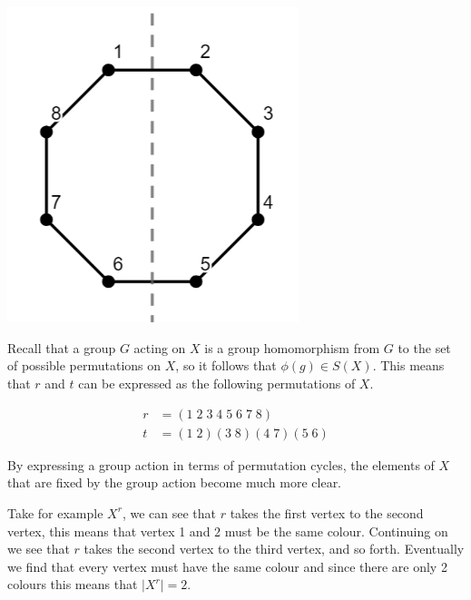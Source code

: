 \documentclass[../main.tex]{subfiles}
\begin{document}
    \begin{center}
    \includegraphics[width=85mm]{images/D8_sym.png}   
    \end{center}

    Recall that a group $G$ acting on $X$ is a group homomorphism from $G$ to the set of possible permutations on $X$, so it follows that $\phi(g) \in S(X)$. This means that $r$ and $t$ can be expressed as the following permutations of $X$.
    
    \begin{align*}
        r &= (1 \;2 \;3 \;4 \;5 \;6 \;7 \;8) \\
        t &= (1 \;2)(3 \;8)(4 \;7)(5 \;6)
    \end{align*}

    By expressing a group action in terms of permutation cycles, the elements of $X$ that are fixed by the group action become much more clear.

    Take for example $X^r$, we can see that $r$ takes the first vertex to the second vertex, this means that vertex 1 and 2 must be the same colour. Continuing on we see that $r$ takes the second vertex to the third vertex, and so forth. Eventually we find that every vertex must have the same colour and since there are only 2 colours this means that $\lvert X^r \rvert = 2$. 
\end{document}
